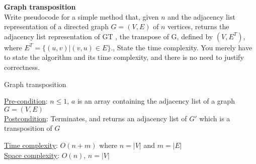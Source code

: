 \textbf{Graph transposition} \\
Write pseudocode for a simple method that, given $n$ and the adjacency list representation of a directed
graph $G = (V, E)$ of $n$ vertices, returns the adjacency list representation of GT , the transpose of G,
defined by $(V, E^T )$, where $E^T = \{(u, v) |(v, u)  \in E\}$., State the time complexity. You merely have to
state the algorithm and its time complexity, and there is no need to justify correctness.

\begin{customsolutionbox}
    \begin{algorithm}[H]
        \caption{Graph transposition}
        \underline{Pre-condition}: $n \leq 1$, $a$ is an array containing the adjacency list of a graph 
        $G=(V, E)$ \\
        \underline{Postcondition}: Terminates, and returns an adjacency list of $G'$ which is a transposition 
        of $G$ \\
    \end{algorithm}

    \underline{Time complexity}: $O(n+m)$ where $n = |V|$ and $m = |E|$ \\
    \underline{Space complexity}: $O(n)$, $n = |V|$
\end{customsolutionbox}
